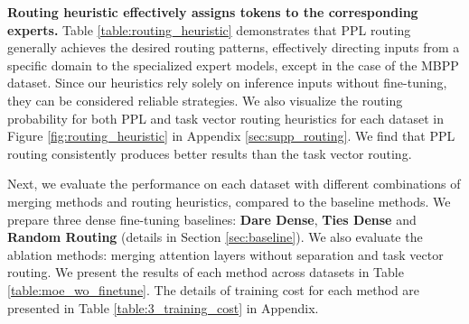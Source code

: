 \noindent \textbf{Routing heuristic effectively assigns tokens to the corresponding experts.} \quad 
Table \ref{table:routing_heuristic} demonstrates that PPL routing generally achieves the desired routing patterns, effectively directing inputs from a specific domain to the specialized expert models, except in the case of the MBPP dataset. Since our heuristics rely solely on inference inputs without fine-tuning, they can be considered reliable strategies. We also visualize the routing probability for both PPL and task vector routing heuristics for each dataset in Figure \ref{fig:routing_heuristic} in Appendix \ref{sec:supp_routing}. We find that PPL routing consistently produces better results than the task vector routing.

Next, we evaluate the performance on each dataset with different combinations of merging methods and routing heuristics, compared to the baseline methods. We prepare three dense fine-tuning baselines: \textbf{Dare Dense}, \textbf{Ties Dense} and \textbf{Random Routing} (details in Section \ref{sec:baseline}). We also evaluate the ablation methods: merging attention layers without separation and task vector routing. We present the results of each method across datasets in Table \ref{table:moe_wo_finetune}. The details of training cost for each method are presented in Table \ref{table:3_training_cost} in Appendix.

